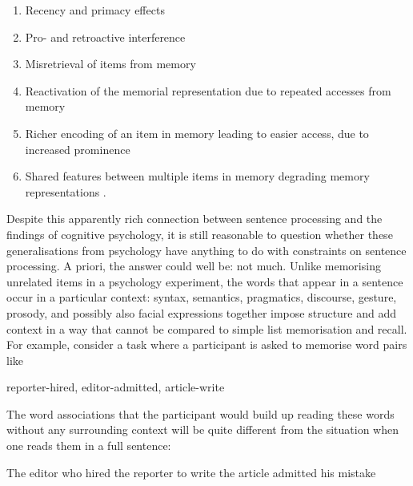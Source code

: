 \documentclass{cambridge7A}\usepackage[]{graphicx}\usepackage[]{color}
\begin{document}
 \begin{enumerate}
\item Recency and primacy effects \citep{Nairne1988,gibsonetal96}
 
\item Pro- and retroactive interference \citep{WatkinsWatkins1975,keppelunderwood,lewis:magical}
\item  Misretrieval of items from memory \citep{patson2016misinterpretations}
\item Reactivation of the memorial representation  due to repeated accesses from memory \citep{VasishthLewis2006} 
 
\item Richer encoding of an item in memory leading to easier access, due to increased prominence \citep{hofmeister07,hofmeister2011representational,HofmeisterVasishth2014}
\item Shared features between multiple items in memory degrading memory representations \citep{Nairne1990,OberauerKliegl2006,VasishthEtAlICCM2017}. 
\end{enumerate}

Despite this apparently rich connection between sentence processing and the findings of cognitive psychology, it  is still reasonable to question whether these generalisations  from psychology have anything to do with constraints on sentence processing. A priori, the answer  could well be: not much. Unlike memorising unrelated items in a psychology experiment, the words that appear in a sentence occur in a particular context: syntax, semantics, pragmatics, discourse, gesture, prosody, and possibly also facial expressions together impose structure and add context in a way that cannot be compared to  simple list memorisation and recall.
  For example, consider  a task where a participant is asked to memorise word pairs  like
  
\begin{exe}
\ex
  reporter-hired, editor-admitted, article-write
\end{exe}

The word associations that the participant would build up reading these words without any surrounding context will be quite different from the situation when one reads them in a full sentence:
  
\begin{exe}
\ex
The editor who hired the reporter to write the article admitted his mistake
\end{exe}
\end{document}
